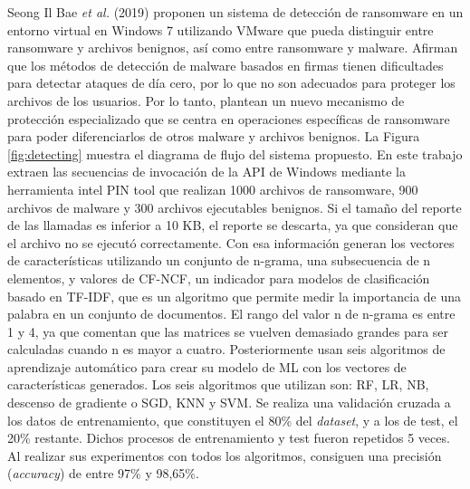 Seong Il Bae \textit{et al.} (2019) \cite{detecting} proponen un sistema de detección de ransomware en un entorno virtual en Windows 7 utilizando VMware que pueda distinguir entre ransomware y archivos benignos, así como entre ransomware y malware. Afirman que los métodos de detección de malware basados en firmas tienen dificultades para detectar ataques de día cero, por lo que no son adecuados para proteger los archivos de los usuarios. Por lo tanto, plantean un nuevo mecanismo de protección especializado que se centra en operaciones específicas de ransomware para poder diferenciarlos de otros malware y archivos benignos. La Figura \ref{fig:detecting} muestra el diagrama de flujo del sistema propuesto. En este trabajo extraen las secuencias de invocación de la \gls{API} de Windows mediante la herramienta intel PIN tool que realizan 1000 archivos de ransomware, 900 archivos de malware y 300 archivos ejecutables benignos. Si el tamaño del reporte de las llamadas es inferior a 10 KB, el reporte se descarta, ya que consideran que el archivo no se ejecutó correctamente. Con esa información generan los vectores de características utilizando un conjunto de n-grama, una subsecuencia de n elementos, y valores de \gls{CF-NCF}, un indicador para modelos de clasificación basado en \gls{TF-IDF}, que es un algoritmo que permite medir la importancia de una palabra en un conjunto de documentos. El rango del valor n de n-grama es entre 1 y 4, ya que comentan que las matrices se vuelven demasiado grandes para ser calculadas cuando n es mayor a cuatro. Posteriormente usan seis algoritmos de aprendizaje automático para crear su modelo de \gls{ML} con los vectores de características generados. Los seis algoritmos que utilizan son: \gls{RF}, \gls{LR}, \gls{NB}, descenso de gradiente o \gls{SGD}, \gls{KNN} y \gls{SVM}. Se realiza una validación cruzada a los datos de entrenamiento, que constituyen el 80\% del \textit{dataset}, y a los de test, el 20\% restante. Dichos procesos de entrenamiento y test fueron repetidos 5 veces. Al realizar sus experimentos con todos los algoritmos, consiguen una precisión (\textit{accuracy}) de entre 97\% y 98,65\%.

